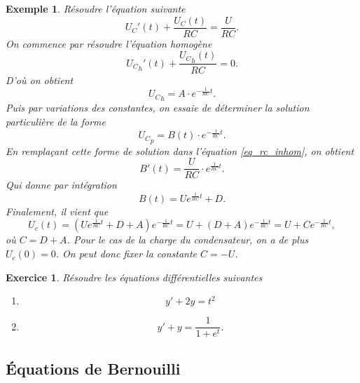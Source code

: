 \documentclass[a4paper,12pt]{book}
\renewcommand{\eqref}[1]{\ref{#1}}
\newtheorem*{exemple}{Exemple}
\newtheorem*{exercice}{Exercice}
\begin{document}
\begin{exemple}
 Résoudre l'équation suivante
\begin{equation}
 U_C'(t)+\frac{U_C(t)}{RC}=\frac{U}{RC}.\label{eq_rc_inhom}
\end{equation}
On commence par résoudre l'équation homogène
\begin{equation}
 {U_C}_h'(t)+\frac{{U_C}_h(t)}{RC}=0.
\end{equation}
D'où on obtient
\begin{equation}
 {U_C}_h=A\cdot e^{-\frac{1}{RC} t}.
\end{equation}
Puis par variations des constantes, on essaie de déterminer la solution particulière de la forme
\begin{equation}
 {U_C}_p=B(t)\cdot e^{-\frac{1}{RC} t}.
\end{equation}
En remplaçant cette forme de solution dans l'équation \eqref{eq_rc_inhom}, on obtient 
\begin{equation}
 B'(t)=\frac{U}{RC}\cdot e^{\frac{1}{RC} t}.
\end{equation}
Qui donne par intégration
\begin{equation}
 B(t)=U e^{\frac{1}{RC} t}+D.
\end{equation}
Finalement, il vient que
\begin{equation}
 U_c(t)=\left(U e^{\frac{1}{RC} t}+D+A\right)e^{-\frac{1}{RC}t}=U+(D+A)e^{-\frac{1}{RC}t}=U+Ce^{-\frac{1}{RC}t},
\end{equation}
où $C=D+A$. Pour le cas de la charge du condensateur, on a de plus 
$U_c(0)=0$. On peut donc fixer la constante $C=-U$.
\end{exemple}

\begin{exercice}
Résoudre les équations différentielles suivantes
\begin{enumerate}
 \item 
 \begin{equation}
  y'+2y=t^2
 \end{equation}
 \item 
 \begin{equation}
  y'+y=\frac{1}{1+e^t}.
 \end{equation}

\end{enumerate}

\end{exercice}

\subsection{Équations de Bernouilli}
\end{document}
